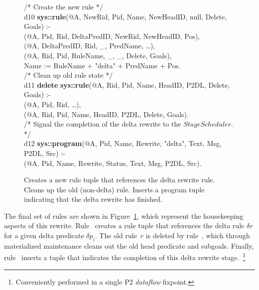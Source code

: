 \begin{figure}[!t]
\ssp
\centering
\begin{boxedminipage}{\linewidth}
/* Create the new rule */ \\
d10 {\bf sys::rule}(@A, NewRid, Pid, Name, NewHeadID, null, Delete, Goals) :- \\
(@A, Pid, Rid, DeltaPredID, NewRid, NewHeadID, Pos), \\
(@A, DeltaPredID, Rid, \_, PredName, \ldots), \\
(@A, Rid, Pid, RuleName, \_, \_, Delete, Goals), \\
\datalogspace Name := RuleName + "delta" + PredName + Pos. \\

/* Clean up old rule state */ \\
d11 {\bf delete} {\bf sys::rule}(@A, Rid, Pid, Name, HeadID, P2DL, Delete, Goals) :- \\
(@A, Pid, Rid, \ldots),  \\
(@A, Rid, Pid, Name, HeadID, P2DL, Delete, Goals). \\
  
/* Signal the completion of the delta rewrite to the $StageScheduler$. */ \\
d12 {\bf sys::program}(@A, Pid, Name, Rewrite, "delta", Text, Msg, P2DL, Src) :- \\
(@A, Pid, Name, Rewrite, Status, Text, Msg, P2DL, Src).

\end{boxedminipage}
\caption{\label{ch:evita:fig:delta4}Creates a new rule tuple that references the delta 
rewrite rule. Cleans up the old (non-delta) rule. Inserts a program tuple indicating
that the delta rewrite has finished. }
\end{figure}

The final set of rules are shown in Figure~\ref{ch:evita:fig:delta4}, which
represent the housekeeping aspects of this rewrite.  Rule~ creates a
rule tuple that references the delta rule $\delta r$ for a given delta
predicate $\delta p_i$.  The old rule~$r$ is deleted by rule~, which
through materialized maintenance cleans out the old head predicate and
subgoals.  Finally, rule~ inserts a  tuple that indicates
the completion of this delta rewrite stage.~\footnote{Conveniently performed in
a single P2 {\em dataflow} fixpoint.}

